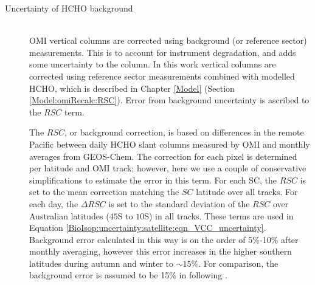 \begin{description}
        
        
      \item [Uncertainty of HCHO background] \hfill \\
        OMI vertical columns are corrected using background (or reference sector) measurements.
        This is to account for instrument degradation, and adds some uncertainty to the column.
        In this work vertical columns are corrected using reference sector measurements combined with modelled HCHO, which is described in Chapter \ref{Model} (Section \ref{Model:omiRecalc:RSC}).
        Error from background uncertainty is ascribed to the $RSC$ term.
        
        The $RSC$, or background correction, is based on differences in the remote Pacific between daily HCHO slant columns measured by OMI and monthly averages from GEOS-Chem.
        The correction for each pixel is determined per latitude and OMI track; however, here we use a couple of conservative simplifications to estimate the error in this term.
        For each SC, the $RSC$ is set to the mean correction matching the $SC$ latitude over all tracks.
        For each day, the $\Delta RSC$ is set to the standard deviation of the $RSC$ over Australian latitudes ($45$\degr S to $10$\degr S) in all tracks.
        These terms are used in Equation \ref{BioIsop:uncertainty:satellite:eqn_VCC_uncertainty}.
        Background error calculated in this way is on the order of 5\%-10\% after monthly averaging, however this error increases in the higher southern latitudes during autumn and winter to $\sim{15}\%$.
        For comparison, the background error is assumed to be 15\% in \textcite{Curci2010} following \parencite{Dufour2009}.
        
        
    \end{description}
